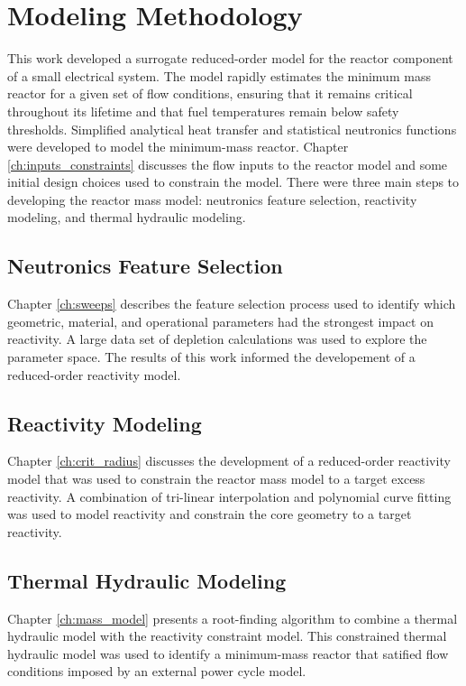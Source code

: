 \section{Modeling Methodology}
This work developed a surrogate reduced-order model for the reactor component of
a small electrical system. The model rapidly estimates the minimum mass reactor 
for a given set of flow conditions, ensuring that it remains critical throughout
its lifetime and that fuel temperatures remain below safety thresholds.
Simplified analytical heat transfer and statistical neutronics functions 
were developed to model the minimum-mass reactor. Chapter
\ref{ch:inputs_constraints} discusses the flow inputs to the reactor model and
some initial design choices used to constrain the model. There were three main steps to
developing the reactor mass model: neutronics feature selection, reactivity
modeling, and thermal hydraulic modeling.

\subsection{Neutronics Feature Selection}
Chapter \ref{ch:sweeps} describes the feature selection process used to identify
which geometric, material, and operational parameters had the strongest impact
on reactivity. A large data set of depletion calculations was used to explore
the parameter space. The results of this work informed the developement of a
reduced-order reactivity model.

\subsection{Reactivity Modeling}
Chapter \ref{ch:crit_radius} discusses the development of a reduced-order
reactivity model that was used to constrain the reactor mass model to a target excess
reactivity. A combination of tri-linear interpolation and polynomial curve
fitting was used to model reactivity and constrain the core geometry to a target
reactivity.

\subsection{Thermal Hydraulic Modeling}
Chapter \ref{ch:mass_model} presents a root-finding algorithm to combine a
thermal hydraulic model with the reactivity constraint model. This constrained
thermal hydraulic model was used to identify a minimum-mass reactor that
satified flow conditions imposed by an external power cycle model.

